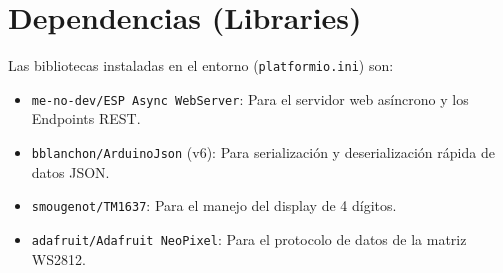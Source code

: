 \documentclass[12pt,a4paper]{article}
\begin{document}
\section{Dependencias (Libraries)}
Las bibliotecas instaladas en el entorno (\texttt{platformio.ini}) son:
\begin{itemize}
    \item \texttt{me-no-dev/ESP Async WebServer}: Para el servidor web asíncrono y los Endpoints REST.
    \item \texttt{bblanchon/ArduinoJson} (v6): Para serialización y deserialización rápida de datos JSON.
    \item \texttt{smougenot/TM1637}: Para el manejo del display de 4 dígitos.
    \item \texttt{adafruit/Adafruit NeoPixel}: Para el protocolo de datos de la matriz WS2812.
\end{itemize}
\end{document}
